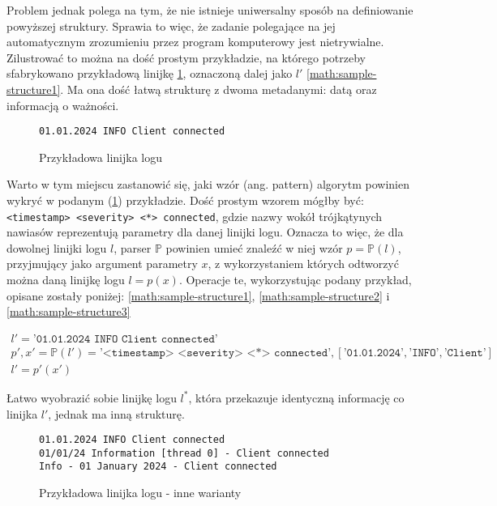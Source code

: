 Problem jednak polega na tym, że nie istnieje uniwersalny sposób na definiowanie
powyższej struktury.
Sprawia to więc, że zadanie polegające na jej automatycznym zrozumieniu przez
program komputerowy jest nietrywialne.
Zilustrować to można na dość prostym przykładzie, na którego potrzeby
sfabrykowano przykładową linijkę \ref{code:sample-line-1}, oznaczoną dalej jako
$l'$ \ref{math:sample-structure1}.
Ma ona dość łatwą strukturę z dwoma metadanymi: datą oraz informacją o ważności.

\begin{figure}[ht]
\begin{verbatim}
01.01.2024 INFO Client connected
\end{verbatim}
\caption{Przykładowa linijka logu}
\label{code:sample-line-1}
\end{figure}

Warto w tym miejscu zastanowić się, jaki wzór (ang. pattern) algorytm powinien wykryć w podanym
(\ref{code:sample-line-1}) przykładzie.
Dość prostym wzorem mógłby być: \texttt{<timestamp> <severity> <*> connected},
gdzie nazwy wokół trójkątynych nawiasów reprezentują parametry dla danej linijki
logu.
Oznacza to więc, że dla dowolnej linijki logu $l$, parser $\mathbb{P}$ powinien umieć
znaleźć w niej wzór $p = \mathbb{P}(l)$, przyjmujący jako argument parametry $x$, z
wykorzystaniem których odtworzyć można daną linijkę logu $l = p(x)$.
Operacje te, wykorzystując podany przykład, opisane zostały poniżej:
\ref{math:sample-structure1}, \ref{math:sample-structure2} i \ref{math:sample-structure3}

\begin{gather}
  l' = \texttt{'01.01.2024 INFO Client connected'}
  \label{math:sample-structure1} \\
  p', x' = \mathbb{P}(l') = \texttt{'<timestamp> <severity> <*> connected'},
  [\texttt{'01.01.2024'}, \texttt{'INFO'}, \texttt{'Client'}]
  \label{math:sample-structure2} \\
  l' = p'(x')
  \label{math:sample-structure3}
\end{gather}

Łatwo wyobrazić sobie linijkę logu $l^*$, która przekazuje identyczną informację
co linijka $l'$, jednak ma inną strukturę.

\begin{figure}[ht]
\begin{verbatim}
01.01.2024 INFO Client connected
01/01/24 Information [thread 0] - Client connected
Info - 01 January 2024 - Client connected
\end{verbatim}
\caption{Przykładowa linijka logu - inne warianty}
\label{code:sample-line-2}
\end{figure}

